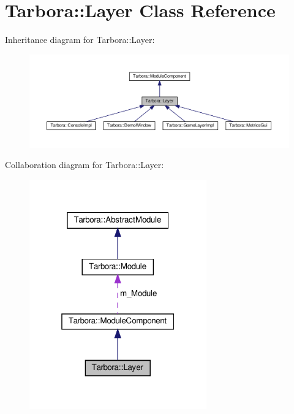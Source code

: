 \hypertarget{classTarbora_1_1Layer}{}\section{Tarbora\+:\+:Layer Class Reference}
\label{classTarbora_1_1Layer}


Inheritance diagram for Tarbora\+:\+:Layer\+:
\nopagebreak
\begin{figure}[H]
\begin{center}
\leavevmode
\includegraphics[width=350pt]{classTarbora_1_1Layer__inherit__graph}
\end{center}
\end{figure}


Collaboration diagram for Tarbora\+:\+:Layer\+:
\nopagebreak
\begin{figure}[H]
\begin{center}
\leavevmode
\includegraphics[width=217pt]{classTarbora_1_1Layer__coll__graph}
\end{center}
\end{figure}

